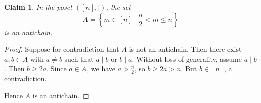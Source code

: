 \documentclass{article}
\newtheorem{claim}{Claim}
\begin{document}
\begin{claim}
    In the poset $([n], \mid)$, the set
    \[
        A = \left\{ m \in [n] \mid \frac{n}{2} < m \leq n \right\}
    \]
    is an antichain.
\end{claim}

\begin{proof}
    Suppose for contradiction that $A$ is not an antichain. Then there exist
    $a, b \in A$ with $a \neq b$ such that $a \mid b$ or $b \mid a$. Without
    loss of generality, assume $a \mid b$. Then $b \geq 2a$. Since $a \in A$,
    we have $a > \frac{n}{2}$, so $b \geq 2a > n$. But $b \in [n]$, a
    contradiction.

    \medskip

    Hence $A$ is an antichain.
\end{proof}
\end{document}
